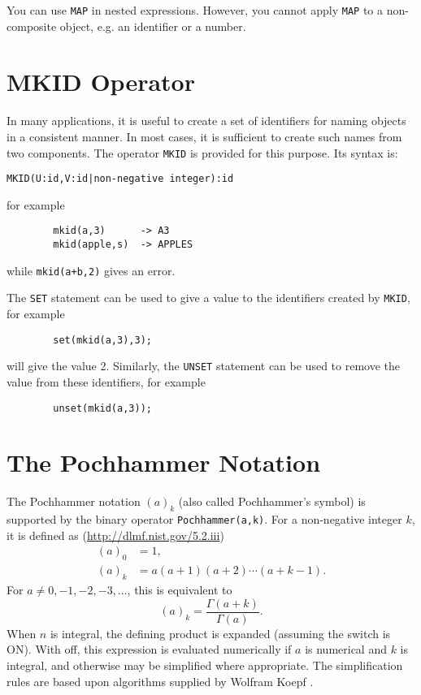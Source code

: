 You can use \texttt{MAP} in nested expressions. However, you cannot
apply \texttt{MAP} to a non-composite object, e.g. an identifier or a number.


\section{MKID Operator}
\hypertarget{operator:MKID}{}
In many applications, it is useful to create a set of identifiers for
naming objects in a consistent manner. In most cases, it is sufficient to
create such names from two components. The operator \texttt{MKID} is provided
for this purpose. Its syntax is:
\begin{verbatim}
MKID(U:id,V:id|non-negative integer):id
\end{verbatim}
for example
\begin{verbatim}
        mkid(a,3)      -> A3
        mkid(apple,s)  -> APPLES
\end{verbatim}
while \texttt{mkid(a+b,2)} gives an error.

The \texttt{SET} statement can be used to give a value to the
identifiers created by \texttt{MKID}, for example
\begin{verbatim}
        set(mkid(a,3),3);
\end{verbatim}
will give  the value 2.
Similarly, the \texttt{UNSET} statement can be used to
remove the value from these identifiers, for example
\begin{verbatim}
        unset(mkid(a,3));
\end{verbatim}

\section{The Pochhammer Notation}
\hypertarget{POCH}{}
\hypertarget{operator:POCHHAMMER}{}
The Pochhammer notation $(a)_k$ (also called Pochhammer's symbol) is supported
by the binary operator \texttt{Pochhammer(a,k)}.
For a non-negative integer $k$, it is defined as
(\url{http://dlmf.nist.gov/5.2.iii})
\begin{align*}
  (a)_0 &= 1, \\
  (a)_k &= a(a+1)(a+2)\cdots(a+k-1).
\end{align*}
For $a \neq 0, -1, -2, -3, \ldots$, this is equivalent to
\[ (a)_k = \frac{\Gamma(a+k)}{\Gamma(a)}. \]
When $n$ is integral, the defining product is expanded (assuming the switch
 is ON). With  off, this expression is evaluated
numerically if $a$ is numerical and $k$ is integral, and otherwise may be
simplified where appropriate.  The simplification rules are based upon
algorithms supplied by Wolfram Koepf \cite{Koepf:92}.

